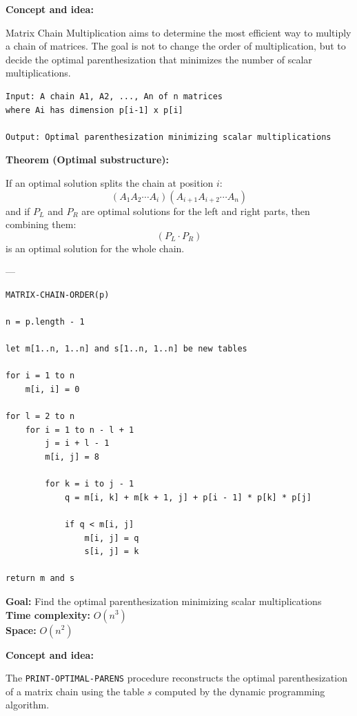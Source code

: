 \documentclass[11pt,a4paper,openany]{book}
\begin{document}
\textbf{Concept and idea:}

Matrix Chain Multiplication aims to determine the most efficient way to multiply a chain of matrices.  
The goal is not to change the order of multiplication, but to decide the optimal parenthesization that minimizes the number of scalar multiplications.

\begin{lstlisting}
Input: A chain A1, A2, ..., An of n matrices
where Ai has dimension p[i-1] x p[i]

Output: Optimal parenthesization minimizing scalar multiplications
\end{lstlisting}

\textbf{Theorem (Optimal substructure):}

If an optimal solution splits the chain at position $i$:
\[
(A_1A_2 \cdots A_i)(A_{i+1}A_{i+2} \cdots A_n)
\]
and if $P_L$ and $P_R$ are optimal solutions for the left and right parts, then combining them:
\[
(P_L \cdot P_R)
\]
is an optimal solution for the whole chain.

---

\begin{lstlisting}
MATRIX-CHAIN-ORDER(p)

n = p.length - 1

let m[1..n, 1..n] and s[1..n, 1..n] be new tables

for i = 1 to n
    m[i, i] = 0

for l = 2 to n
    for i = 1 to n - l + 1
        j = i + l - 1
        m[i, j] = 8

        for k = i to j - 1
            q = m[i, k] + m[k + 1, j] + p[i - 1] * p[k] * p[j]

            if q < m[i, j]
                m[i, j] = q
                s[i, j] = k

return m and s
\end{lstlisting}

\textbf{Goal:} Find the optimal parenthesization minimizing scalar multiplications \\

\textbf{Time complexity:} $O(n^3)$ \\

\textbf{Space:} $O(n^2)$

\vspace{2cm}

\textbf{Concept and idea:}

The \texttt{PRINT-OPTIMAL-PARENS} procedure reconstructs the optimal parenthesization of a matrix chain using the table $s$ computed by the dynamic programming algorithm.
\end{document}
